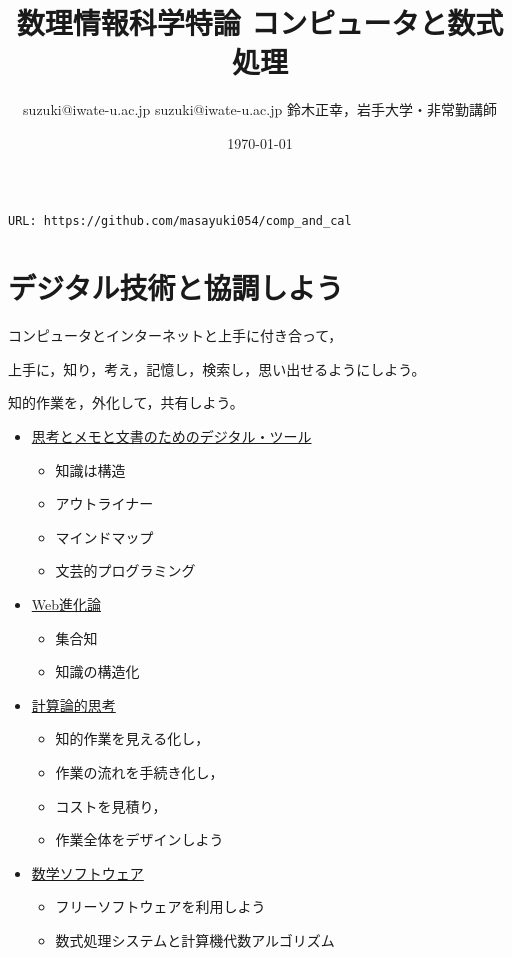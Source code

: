 \documentclass[dvipdfmx,11pat]{jarticle}
\author{suzuki@iwate-u.ac.jp suzuki@iwate-u.ac.jp 鈴木正幸，岩手大学・非常勤講師}
\date{\today}
\title{数理情報科学特論 コンピュータと数式処理}
\begin{document}
\maketitle
\begin{center}
\large{\tt URL: https://github.com/masayuki054/comp\_and\_cal}
\end{center}

\section*{デジタル技術と協調しよう}
\label{sec:org094082a}

コンピュータとインターネットと上手に付き合って，

上手に，知り，考え，記憶し，検索し，思い出せるようにしよう。

知的作業を，外化して，共有しよう。

\begin{itemize}
\item \href{./org/digital\_tools.org}{思考とメモと文書のためのデジタル・ツール}

\begin{itemize}
\item 知識は構造
\item アウトライナー
\item マインドマップ
\item 文芸的プログラミング
\end{itemize}

\item \href{./org/web.org}{Web進化論}

\begin{itemize}
\item 集合知
\item 知識の構造化
\end{itemize}

\item \href{./org/comp\_thinking.org}{計算論的思考}

\begin{itemize}
\item 知的作業を見える化し，
\item 作業の流れを手続き化し，
\item コストを見積り，
\item 作業全体をデザインしよう
\end{itemize}

\item \href{./org/math-soft.org}{数学ソフトウェア}

\begin{itemize}
\item フリーソフトウェアを利用しよう
\item 数式処理システムと計算機代数アルゴリズム
\end{itemize}
\end{itemize}
\end{document}
